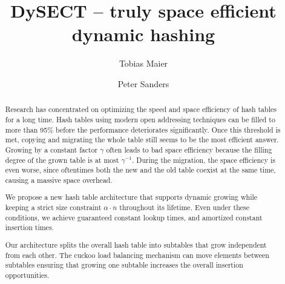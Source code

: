 \documentclass[a4paper,UKenglish]{lipics-v2016}
\title{DySECT -- truly space efficient dynamic hashing} %
\author[1]{Tobias Maier}
\author[1]{Peter Sanders}
\affil[1]{Karlsruhe Institute of Technology, Karlsruhe, Deutschland\\
  \texttt{\{t.maier, sanders\}@kit.edu}}
\begin{document}
\maketitle

\begin{abstract}
Research has concentrated on optimizing the speed and space efficiency
of hash tables for a long time.  Hash tables using modern open
addressing techniques can be filled to more than 95\% before the
performance deteriorates significantly.  Once this threshold is met,
copying and migrating the whole table still seems to be the most
efficient answer.  Growing by a constant factor $\gamma$ often leads
to bad space efficiency because the filling degree of the grown table
is at most $\gamma^{-1}$. During the migration, the space efficiency
is even worse, since oftentimes both the new and the old table coexist
at the same time, causing a massive space overhead.

We propose a new hash table
architecture that supports dynamic growing while keeping a strict size
constraint $\alpha \cdot n$ throughout its lifetime.  Even under these
conditions, we achieve guaranteed constant lookup times, and amortized
constant insertion times.

Our architecture splits the overall hash table into subtables that
grow independent from each other.  The cuckoo load balancing mechanism
can move elements between subtables ensuring that growing one
subtable increases the overall insertion opportunities.
 \end{abstract}
\end{document}
